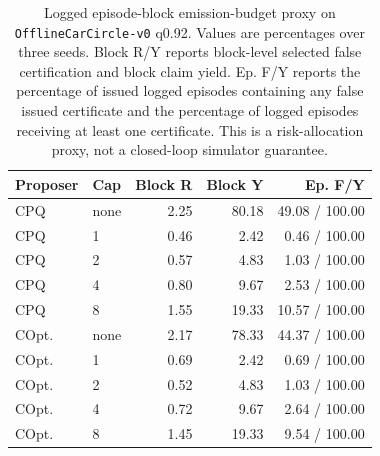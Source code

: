 \begin{table}[t]
\centering
\small
\setlength{\tabcolsep}{3pt}
\begin{tabular}{llrrr}
\toprule
Proposer & Cap & Block R & Block Y & Ep. F/Y \\
\midrule
CPQ & none & 2.25 & 80.18 & 49.08 / 100.00 \\
CPQ & 1 & 0.46 & 2.42 & 0.46 / 100.00 \\
CPQ & 2 & 0.57 & 4.83 & 1.03 / 100.00 \\
CPQ & 4 & 0.80 & 9.67 & 2.53 / 100.00 \\
CPQ & 8 & 1.55 & 19.33 & 10.57 / 100.00 \\
\midrule
COpt. & none & 2.17 & 78.33 & 44.37 / 100.00 \\
COpt. & 1 & 0.69 & 2.42 & 0.69 / 100.00 \\
COpt. & 2 & 0.52 & 4.83 & 1.03 / 100.00 \\
COpt. & 4 & 0.72 & 9.67 & 2.64 / 100.00 \\
COpt. & 8 & 1.45 & 19.33 & 9.54 / 100.00 \\
\bottomrule
\end{tabular}
\caption{Logged episode-block emission-budget proxy on \texttt{OfflineCarCircle-v0} q0.92. Values are percentages over three seeds. Block R/Y reports block-level selected false certification and block claim yield. Ep. F/Y reports the percentage of issued logged episodes containing any false issued certificate and the percentage of logged episodes receiving at least one certificate. This is a risk-allocation proxy, not a closed-loop simulator guarantee.}
\label{tab:episode-budget}
\end{table}
